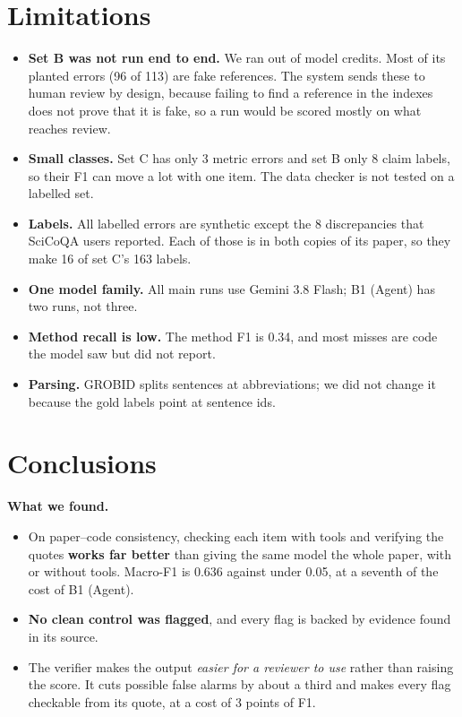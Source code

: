 \documentclass[11pt,a4paper]{article}
\begin{document}
\section{Limitations}\label{sec:limits}
\begin{itemize}
\item \textbf{Set B was not run end to end.} We ran out of model credits. Most of its planted
errors (96 of 113) are fake references. The system sends these to human review by design, because
failing to find a reference in the indexes does not prove that it is fake, so a run would be scored
mostly on what reaches review.
\item \textbf{Small classes.} Set C has only 3 metric errors and set B only 8 claim labels, so their
F1 can move a lot with one item. The data checker is not tested on a labelled set.
\item \textbf{Labels.} All labelled errors are synthetic except the 8 discrepancies that SciCoQA
users reported. Each of those is in both copies of its paper, so they make 16 of set C's 163
labels.
\item \textbf{One model family.} All main runs use Gemini 3.8 Flash; B1 (Agent) has two runs, not three.
\item \textbf{Method recall is low.} The method F1 is 0.34, and most misses are code the model saw but
did not report.
\item \textbf{Parsing.} GROBID splits sentences at abbreviations; we did not change it because the gold
labels point at sentence ids.\end{itemize}

\section{Conclusions}
\textbf{What we found.}
\begin{itemize}
\item On paper--code consistency, checking each item with tools and verifying the quotes \textbf{works far
better} than giving the same model the whole paper, with or without tools. Macro-F1 is 0.636
against under 0.05, at a seventh of the cost of B1 (Agent).
\item \textbf{No clean control was flagged}, and every flag is backed by evidence found in its source.
\item The verifier makes the output \emph{easier for a reviewer to use} rather than raising the score. It
cuts possible false alarms by about a third and makes every flag checkable from its quote, at a
cost of 3 points of F1.
\end{itemize}
\end{document}
